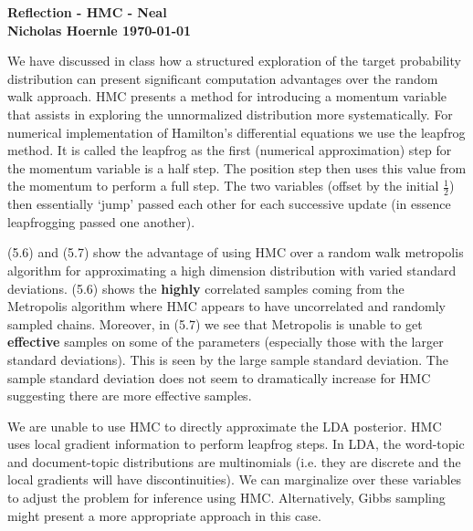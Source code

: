 \documentclass[twoside]{article}
\begin{document}
\textbf{Reflection - HMC - Neal}\\
\textbf{Nicholas Hoernle \hfill \today}

We have discussed in class how a structured exploration of the target probability distribution can present significant computation advantages over the random walk approach. HMC presents a method for introducing a momentum variable that assists in exploring the unnormalized distribution more systematically. For numerical implementation of Hamilton's differential equations we use the leapfrog method. It is called the leapfrog as the first (numerical approximation) step for the momentum variable is a half step. The position step then uses this value from the momentum to perform a full step. The two variables (offset by the initial $\frac{1}{2}$) then essentially `jump' passed each other for each successive update (in essence leapfrogging passed one another).

(5.6) and (5.7) show the advantage of using HMC over a random walk metropolis algorithm for approximating a high dimension distribution with varied standard deviations. (5.6) shows the \textbf{highly} correlated samples coming from the Metropolis algorithm where HMC appears to have uncorrelated and randomly sampled chains. Moreover, in (5.7) we see that Metropolis is unable to get \textbf{effective} samples on some of the parameters (especially those with the larger standard deviations). This is seen by the large sample standard deviation. The sample standard deviation does not seem to dramatically increase for HMC suggesting there are more effective samples.

We are unable to use HMC to directly approximate the LDA posterior. HMC uses local gradient information to perform leapfrog steps. In LDA, the word-topic and document-topic distributions are multinomials (i.e. they are discrete and the local gradients will have discontinuities). We can marginalize over these variables to adjust the problem for inference using HMC. Alternatively, Gibbs sampling might present a more appropriate approach in this case.
\end{document}
